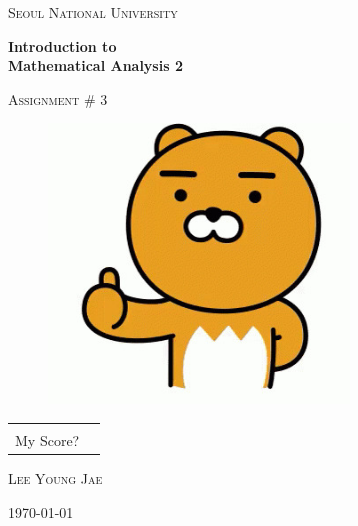 \documentclass{article}
\begin{document}
\begin{titlepage}
\centering
{\scshape\LARGE Seoul National University \par}
\vspace{1.5cm}
{\huge\bfseries Introduction to\\Mathematical Analysis 2\par}
\vspace{1cm}
{\scshape\Large Assignment \# 3\par}

\vspace{1cm}

\begin{figure}[ht!]
\centering
\includegraphics[width=80mm]{lion.jpg}
\end{figure}

\vspace{1cm}

\arrayrulewidth=1.2pt
\begin{tabular}{p{2.5cm}p{2cm}}
\centering
& \\
\cline{2-2}
\vspace{-.73cm}
My Score? & \\
\end{tabular}



\vfill
{}
\vspace{.7cm}\par
\textsc{\large Lee Young Jae}
\vspace{.7cm}\par
{\Large \today\par}
\end{titlepage}

\setlength{\parindent}{0cm}
\end{document}

